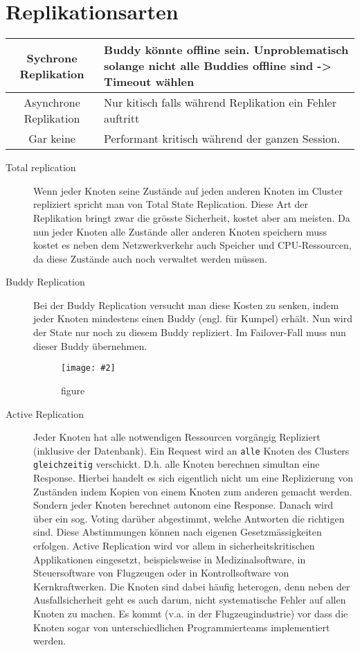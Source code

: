 \documentclass[a4paper,10pt]{scrreprt}
\newcommand{\pic}[2][figure]{\begin{figure}[h]
 \centering
 \texttt{[image: \#2]}
 \caption{#1}
\end{figure}
}
\begin{document}
\section{Replikationsarten} %
\begin{tabular}{|c|p{5cm}|}
Sychrone Replikation & Buddy könnte offline sein. Unproblematisch solange nicht alle Buddies offline sind -> Timeout wählen \\ \hline
Asynchrone Replikation & Nur kitisch falls während Replikation ein Fehler auftritt \\ \hline
Gar keine & Performant kritisch während der ganzen Session.
\end{tabular}
\begin{description}
	\item[Total replication]Wenn jeder Knoten seine Zustände auf jeden anderen Knoten im Cluster repliziert spricht man von Total State
Replication. Diese Art der Replikation bringt zwar die grösste Sicherheit, kostet aber am meisten. Da nun jeder
Knoten alle Zustände aller anderen Knoten speichern muss kostet es neben dem Netzwerkverkehr auch
Speicher und CPU-Ressourcen, da diese Zustände auch noch verwaltet werden müssen.
\item[Buddy Replication] Bei der Buddy Replication versucht man diese
Kosten zu senken, indem jeder Knoten
mindestens einen Buddy (engl. für Kumpel)
erhält. Nun wird der State nur noch zu diesem
Buddy repliziert. Im Failover-Fall muss nun
dieser Buddy übernehmen.
\pic{br.png}
\item[Active Replication] Jeder Knoten hat alle notwendigen Ressourcen vorgängig Repliziert (inklusive der Datenbank). Ein Request wird
an \texttt{alle} Knoten des Clusters \texttt{gleichzeitig} verschickt. D.h. alle Knoten berechnen simultan eine Response. Hierbei
handelt es sich eigentlich nicht um eine Replizierung von Zuständen indem Kopien von einem Knoten zum
anderen gemacht werden. Sondern jeder Knoten berechnet autonom eine Response. Danach wird über ein sog.
Voting darüber abgestimmt, welche Antworten die richtigen sind. Diese Abstimmungen können nach eigenen
Gesetzmässigkeiten erfolgen. Active Replication wird vor allem in sicherheitskritischen Applikationen eingesetzt,
beispielsweise in Medizinalsoftware, in Steuersoftware von Flugzeugen oder in Kontrollsoftware von
Kernkraftwerken. Die Knoten sind dabei häufig heterogen, denn neben der Ausfallsicherheit geht es auch
darum, nicht systematische Fehler auf allen Knoten zu machen. Es kommt (v.a. in der Flugzeugindustrie) vor
dass die Knoten sogar von unterschiedlichen Programmierteams implementiert werden.

\end{description}
\end{document}
